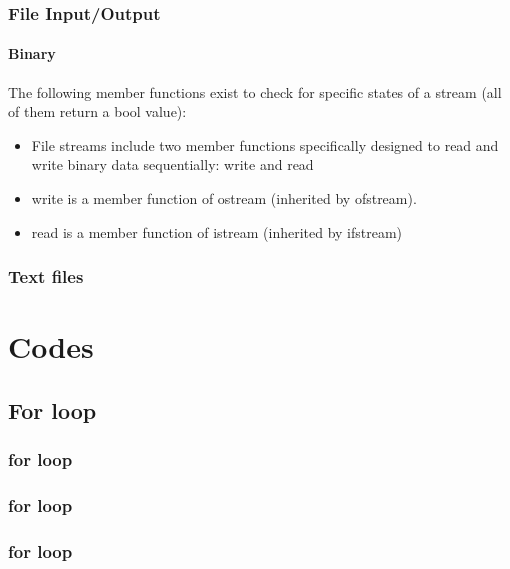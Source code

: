 \documentclass[hyperref={pdfpagelabels=true}]{beamer}
\begin{document}
\begin{frame}
\frametitle{File Input/Output}
\framesubtitle{Binary}
\scriptsize
The following member functions exist to check for specific states of a stream (all of them return a bool value): 
\begin{itemize}[<+->]
\item File streams include two member functions specifically designed to read and write binary data sequentially: \alert{write} and  \alert{read}
\item \alert{write} is a member function of ostream (inherited by ofstream). 
\item \alert{read} is a member function of istream (inherited by ifstream)
\end{itemize}

\end{frame}



\begin{frame}[shrink]
\frametitle{Text files}

\end{frame}




\section{Codes}
\subsection{For loop}

\begin{frame}
\frametitle{for loop}
\begin{tcolorbox}[title= ,width=9.85 cm]

\end{tcolorbox}
\end{frame}

\begin{frame}
\frametitle{for loop}
\begin{tcolorbox}[title= ,width=9.85 cm]

\end{tcolorbox}
\end{frame}

\begin{frame}
\frametitle{for loop}
\begin{tcolorbox}[title=Custom Count Down,width=9.85 cm]

\end{tcolorbox}
\end{frame}
\end{document}
